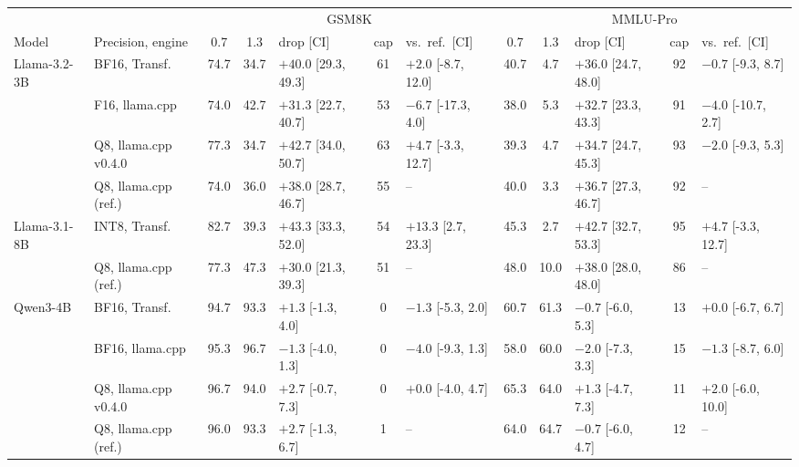 \begin{tabular}{llcclclcclcl}
\toprule
 & & \multicolumn{5}{c}{GSM8K} & \multicolumn{5}{c}{MMLU-Pro} \\
Model & Precision, engine & 0.7 & 1.3 & drop [CI] & cap & vs.\ ref.\ [CI] & 0.7 & 1.3 & drop [CI] & cap & vs.\ ref.\ [CI] \\
\midrule
Llama-3.2-3B & BF16, Transf. & 74.7 & 34.7 & $+40.0$ [29.3, 49.3] & 61 & $+2.0$ [-8.7, 12.0] & 40.7 & 4.7 & $+36.0$ [24.7, 48.0] & 92 & $-0.7$ [-9.3, 8.7] \\
 & F16, llama.cpp & 74.0 & 42.7 & $+31.3$ [22.7, 40.7] & 53 & $-6.7$ [-17.3, 4.0] & 38.0 & 5.3 & $+32.7$ [23.3, 43.3] & 91 & $-4.0$ [-10.7, 2.7] \\
 & Q8, llama.cpp v0.4.0 & 77.3 & 34.7 & $+42.7$ [34.0, 50.7] & 63 & $+4.7$ [-3.3, 12.7] & 39.3 & 4.7 & $+34.7$ [24.7, 45.3] & 93 & $-2.0$ [-9.3, 5.3] \\
 & Q8, llama.cpp (ref.) & 74.0 & 36.0 & $+38.0$ [28.7, 46.7] & 55 & -- & 40.0 & 3.3 & $+36.7$ [27.3, 46.7] & 92 & -- \\
\midrule
Llama-3.1-8B & INT8, Transf. & 82.7 & 39.3 & $+43.3$ [33.3, 52.0] & 54 & $+13.3$ [2.7, 23.3] & 45.3 & 2.7 & $+42.7$ [32.7, 53.3] & 95 & $+4.7$ [-3.3, 12.7] \\
 & Q8, llama.cpp (ref.) & 77.3 & 47.3 & $+30.0$ [21.3, 39.3] & 51 & -- & 48.0 & 10.0 & $+38.0$ [28.0, 48.0] & 86 & -- \\
\midrule
Qwen3-4B & BF16, Transf. & 94.7 & 93.3 & $+1.3$ [-1.3, 4.0] & 0 & $-1.3$ [-5.3, 2.0] & 60.7 & 61.3 & $-0.7$ [-6.0, 5.3] & 13 & $+0.0$ [-6.7, 6.7] \\
 & BF16, llama.cpp & 95.3 & 96.7 & $-1.3$ [-4.0, 1.3] & 0 & $-4.0$ [-9.3, 1.3] & 58.0 & 60.0 & $-2.0$ [-7.3, 3.3] & 15 & $-1.3$ [-8.7, 6.0] \\
 & Q8, llama.cpp v0.4.0 & 96.7 & 94.0 & $+2.7$ [-0.7, 7.3] & 0 & $+0.0$ [-4.0, 4.7] & 65.3 & 64.0 & $+1.3$ [-4.7, 7.3] & 11 & $+2.0$ [-6.0, 10.0] \\
 & Q8, llama.cpp (ref.) & 96.0 & 93.3 & $+2.7$ [-1.3, 6.7] & 1 & -- & 64.0 & 64.7 & $-0.7$ [-6.0, 4.7] & 12 & -- \\
\bottomrule
\end{tabular}
